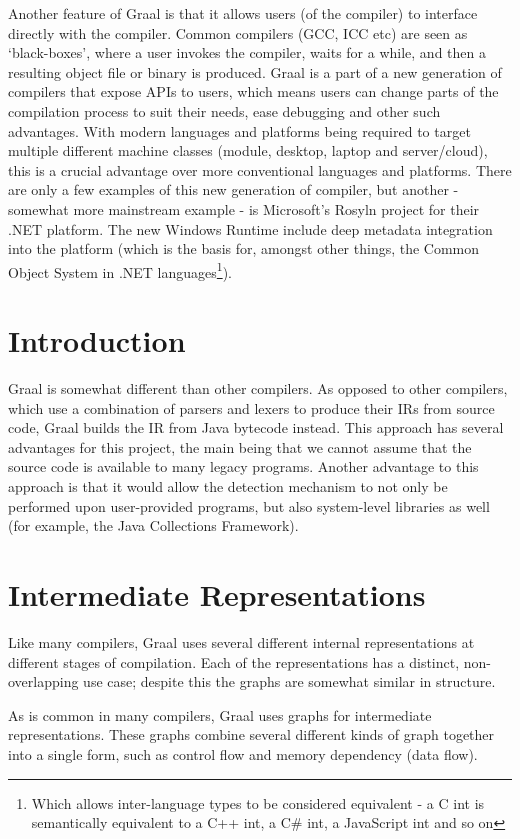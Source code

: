 Another feature of Graal is that it allows users (of the compiler) to interface directly with the compiler. Common compilers (GCC, ICC etc) are seen as `black-boxes', where a user invokes the compiler, waits for a while, and then a resulting object file or binary is produced. Graal is a part of a new generation of compilers that expose APIs to users, which means users can change parts of the compilation process to suit their needs, ease debugging and other such advantages. With modern languages and platforms being required to target multiple different machine classes (module, desktop, laptop and server/cloud), this is a crucial advantage over more conventional languages and platforms. There are only a few examples of this new generation of compiler, but another - somewhat more mainstream example - is Microsoft's Rosyln project for their .NET platform. The new Windows Runtime include deep metadata integration into the platform (which is the basis for, amongst other things, the Common Object System in .NET languages\footnote{Which allows inter-language types to be considered equivalent - a C int is semantically equivalent to a C++ int, a C\# int, a JavaScript int and so on}).

\section{Introduction} \label{sec:graal/introduction}
Graal is somewhat different than other compilers. As opposed to other compilers, which use a combination of parsers and lexers to produce their IRs from source code, Graal builds the IR from Java bytecode instead. This approach has several advantages for this project, the main being that we cannot assume that the source code is available to many legacy programs. Another advantage to this approach is that it would allow the detection mechanism to not only be performed upon user-provided programs, but also system-level libraries as well (for example, the Java Collections Framework). 

\section{Intermediate Representations} \label{sec:graal/ir}
Like many compilers, Graal uses several different internal representations at different stages of compilation. Each of the representations has a distinct, non-overlapping use case; despite this the graphs are somewhat similar in structure.

As is common in many compilers, Graal uses graphs for intermediate representations. These graphs combine several different kinds of graph together into a single form, such as control flow and memory dependency (data flow).


